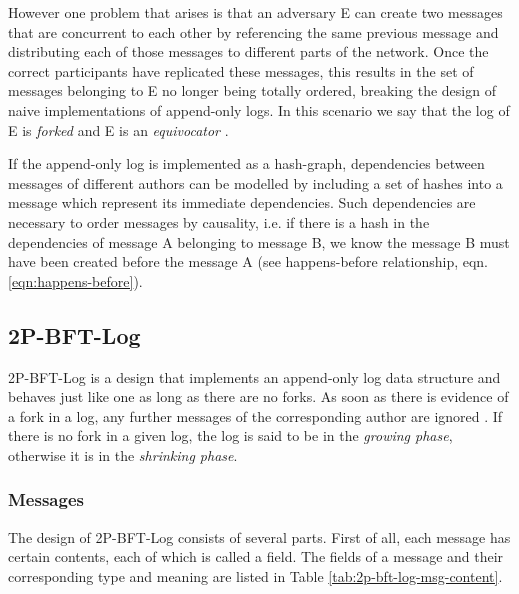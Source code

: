 \documentclass{article}
\begin{document}
However one problem that arises is that an adversary E can create two messages that are concurrent to each other by referencing the same previous message and distributing each of those messages to different parts of the network. Once the correct participants have replicated these messages, this results in the set of messages belonging to E no longer being totally ordered, breaking the design of naive implementations of append-only logs. In this scenario we say that the log of E is \emph{forked} and E is an \emph{equivocator} \cite{blocklace-crdt}.

If the append-only log is implemented as a hash-graph, dependencies between messages of different authors can be modelled by including a set of hashes into a message which represent its immediate dependencies. Such dependencies are necessary to order messages by causality, i.e. if there is a hash in the dependencies of message A belonging to message B, we know the message B must have been created before the message A (see happens-before relationship, eqn. \ref{eqn:happens-before}).

\subsection{2P-BFT-Log}
2P-BFT-Log is a design that implements an append-only log data structure and behaves just like one as long as there are no forks. As soon as there is evidence of a fork in a log, any further messages of the corresponding author are ignored \cite{2p-bft-log}. If there is no fork in a given log, the log is said to be in the \emph{growing phase}, otherwise it is in the \emph{shrinking phase}.

\subsubsection{Messages}
The design of 2P-BFT-Log consists of several parts. First of all, each message has certain contents, each of which is called a field. The fields of a message and their corresponding type and meaning are listed in Table \ref{tab:2p-bft-log-msg-content}.
\end{document}
